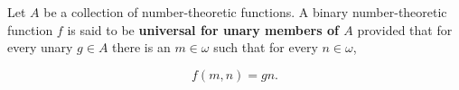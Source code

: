 Let $A$ be a collection of number-theoretic functions. A binary number-theoretic function $f$ is said to be \textbf{universal for unary members of $A$} provided that for every unary $g \in A$ there is an $m \in \omega$ such that for every $n \in \omega$,

$$f(m, n) = gn.$$
